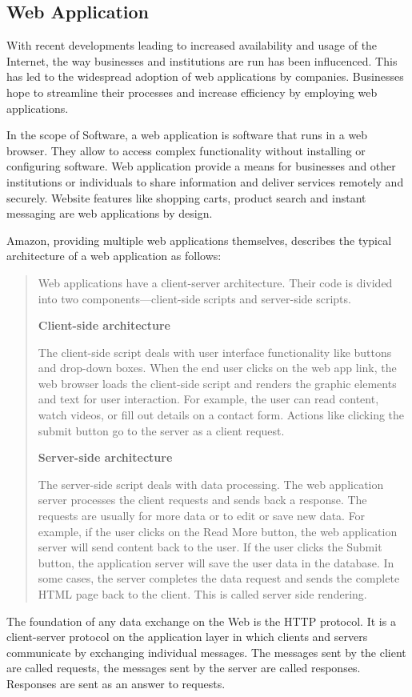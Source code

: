 \subsection{Web Application}
With recent developments leading to increased availability and usage of the Internet, the way businesses and institutions are run has been influcenced.
This has led to the widespread adoption of web applications by companies. \cite{stackpath/webapp}
Businesses hope to streamline their processes and increase efficiency by employing web applications. 

In the scope of Software, a web application is software that runs in a web browser.
They allow to access complex functionality without installing or configuring software.
Web application provide a means for businesses and other institutions or individuals to share information and deliver services remotely and securely.
Website features like shopping carts, product search and instant messaging are web applications by design. \cite{aws/webapp}

Amazon, providing multiple web applications themselves, describes the typical architecture of a web application as follows:
\begin{quote}
	Web applications have a client-server architecture.
	Their code is divided into two components—client-side scripts and server-side scripts.


	\textbf{Client-side architecture}


	The client-side script deals with user interface functionality like buttons and drop-down boxes.
	When the end user clicks on the web app link, the web browser loads the client-side script and renders the graphic elements and text for user interaction.
	For example, the user can read content, watch videos, or fill out details on a contact form.
	Actions like clicking the submit button go to the server as a client request.


	\textbf{Server-side architecture}


	The server-side script deals with data processing.
	The web application server processes the client requests and sends back a response.
	The requests are usually for more data or to edit or save new data.
	For example, if the user clicks on the Read More button, the web application server will send content back to the user.
	If the user clicks the Submit button, the application server will save the user data in the database.
	In some cases, the server completes the data request and sends the complete HTML page back to the client.
	This is called server side rendering. \cite{aws/webapp}
\end{quote}
The foundation of any data exchange on the Web is the HTTP protocol.
It is a client-server protocol on the application layer in which clients and servers communicate by exchanging individual messages.
The messages sent by the client are called requests, the messages sent by the server are called responses. Responses are sent as an answer to requests.

